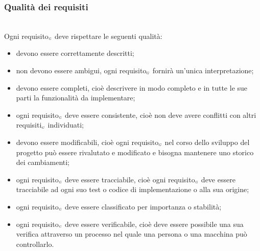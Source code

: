 \subsubsection{Qualità dei requisiti}\label{ProcessiPrimariProspettiveAnalisiDeiRequisitiQualitàDeiRequisiti}\mbox{}\\
Ogni requisito$_{\scaleto{G}{3pt}}$ deve rispettare le seguenti qualità:
\begin{itemize}
	\item devono essere correttamente descritti;
	\item non devono essere ambigui, ogni requisito$_{\scaleto{G}{3pt}}$ fornirà un'unica interpretazione;
	\item devono essere completi, cioè descrivere in modo completo e in tutte le sue parti la funzionalità da implementare;
	\item ogni requisito$_{\scaleto{G}{3pt}}$ deve essere consistente, cioè non deve avere conflitti con altri requisiti$_{\scaleto{G}{3pt}}$ individuati;
	\item devono essere modificabili, cioè ogni requisito$_{\scaleto{G}{3pt}}$ nel corso dello sviluppo del progetto può essere rivalutato e modificato e bisogna mantenere uno storico dei cambiamenti;
	\item ogni requisito$_{\scaleto{G}{3pt}}$ deve essere tracciabile, cioè ogni requisito$_{\scaleto{G}{3pt}}$ deve essere tracciabile ad ogni suo test o codice di implementazione o alla sua origine;
	\item ogni requisito$_{\scaleto{G}{3pt}}$ deve essere classificato per importanza o stabilità;
	\item ogni requisito$_{\scaleto{G}{3pt}}$ deve essere verificabile, cioè deve essere possibile una sua verifica attraverso un processo nel quale una persona o una macchina può controllarlo.
\end{itemize}

